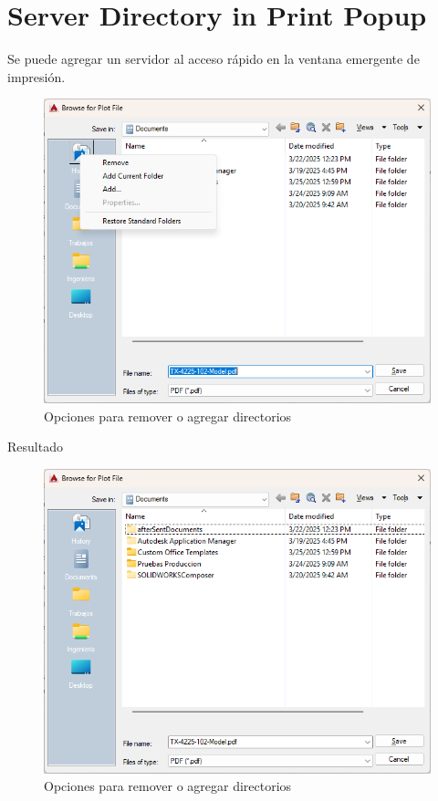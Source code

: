 \documentclass[12pt,letterpaper,final]{report}
\begin{document}
\chapter{Server Directory in Print Popup}

Se puede agregar un servidor al acceso rápido en la ventana emergente de impresión.

\begin{figure}[H]
	\centering
	\includegraphics[width=0.85\linewidth, height=0.5\textheight,keepaspectratio]{Imagenes/autocad_printdirectory_01}
	\caption{Opciones para remover o agregar directorios}
	\label{fig:autocadprintdirectory01}
\end{figure}

{\LARGE Resultado}

\begin{figure}[H]
	\centering
	\includegraphics[width=0.85\linewidth, height=0.5\textheight,keepaspectratio]{Imagenes/autocad_printdirectory_02}
	\caption{Opciones para remover o agregar directorios}
	\label{fig:autocadprintdirectory02}
\end{figure}
\end{document}
